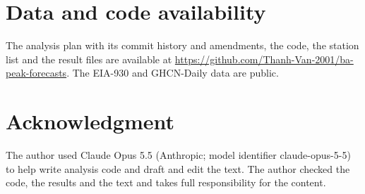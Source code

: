 \documentclass[conference,a4paper]{IEEEtran}
\newcommand{\repoURL}{https://github.com/Thanh-Van-2001/ba-peak-forecasts}
\begin{document}
\section*{Data and code availability}
The analysis plan with its commit history and amendments, the code, the station list and the result files are available at \url{\repoURL}. The EIA-930 and GHCN-Daily data are public.

\section*{Acknowledgment}
The author used Claude Opus 5.5 (Anthropic; model identifier claude-opus-5-5) to help write analysis code and draft and edit the text. The author checked the code, the results and the text and takes full responsibility for the content.



\end{document}
